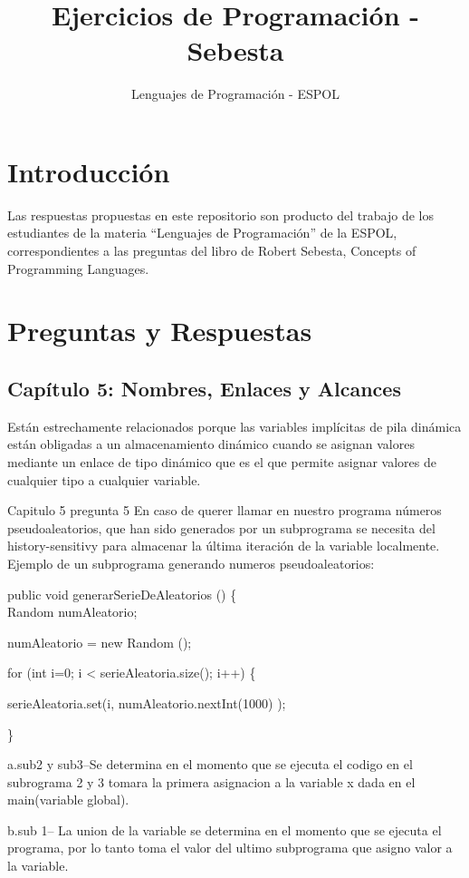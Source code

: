 \documentclass[12pt,oneside]{article}
\title{Ejercicios de Programación - Sebesta}
\author{Lenguajes de Programación - ESPOL}
\begin{document}
\maketitle

\section{Introducción}
Las respuestas propuestas en este repositorio son producto del trabajo de los estudiantes de la materia ``Lenguajes de Programación'' de la ESPOL, correspondientes a las preguntas del libro de Robert Sebesta, Concepts of Programming Languages.

\section{Preguntas y Respuestas}

\subsection{Capítulo 5: Nombres, Enlaces y Alcances}

Están estrechamente relacionados porque las variables implícitas de pila dinámica están obligadas
a un almacenamiento dinámico cuando se asignan valores mediante un enlace de tipo dinámico que es el que permite asignar valores de cualquier tipo a cualquier variable.


Capitulo 5 pregunta 5
En caso de querer llamar en nuestro programa números pseudoaleatorios, que han sido generados por un subprograma se necesita del history-sensitivy para almacenar la última iteración de la variable localmente. 
Ejemplo de un subprograma generando numeros pseudoaleatorios:

 public void generarSerieDeAleatorios () \{  \\

        Random numAleatorio;

        numAleatorio = new Random ();

        for (int i=0; i < serieAleatoria.size(); i++)  \{

        serieAleatoria.set(i, numAleatorio.nextInt(1000) );

         \}

a.sub2 y sub3--Se determina en el momento que se ejecuta el codigo en el subrograma 2 y 3 tomara la primera 
asignacion a la variable x dada en el main(variable global).

b.sub 1--  La union de la variable se determina en el momento que se ejecuta el programa, por lo tanto toma el 
valor del ultimo subprograma que asigno valor a la variable.
\end{document}
